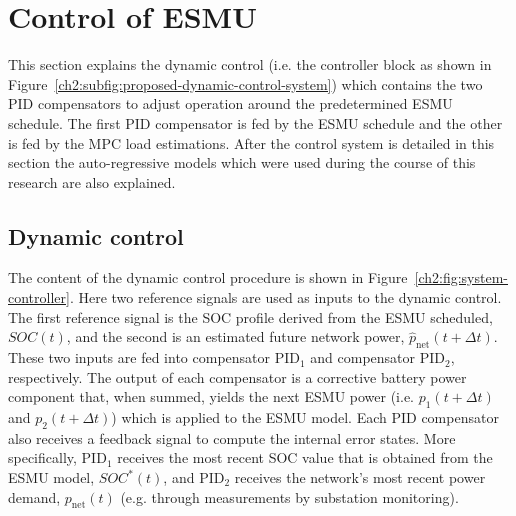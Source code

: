 \section{Control of ESMU}
\label{ch2:sec:control-of-esmu}



This section explains the dynamic control (i.e. the controller block as shown in Figure~\ref{ch2:subfig:proposed-dynamic-control-system}) which contains the two PID compensators to adjust operation around the predetermined ESMU schedule.
The first PID compensator is fed by the ESMU schedule and the other is fed by the MPC load estimations.
After the control system is detailed in this section the auto-regressive models which were used during the course of this research are also explained.

\subsection{Dynamic control}

The content of the dynamic control procedure is shown in Figure~\ref{ch2:fig:system-controller}.
Here two reference signals are used as inputs to the dynamic control.
The first reference signal is the SOC profile derived from the ESMU scheduled, $SOC(t)$, and the second is an estimated future network power, $\hat{p}_\text{net}(t+\Delta t)$.
These two inputs are fed into compensator PID$_1$ and compensator PID$_2$, respectively.
The output of each compensator is a corrective battery power component that, when summed, yields the next ESMU power (i.e. $p_1(t+\Delta t)$ and $p_2(t+\Delta t)$) which is applied to the ESMU model.
Each PID compensator also receives a feedback signal to compute the internal error states.
More specifically, PID$_1$ receives the most recent SOC value that is obtained from the ESMU model, $SOC^*(t)$, and PID$_2$ receives the network's most recent power demand, $p_\text{net}(t)$ (e.g. through measurements by substation monitoring).

